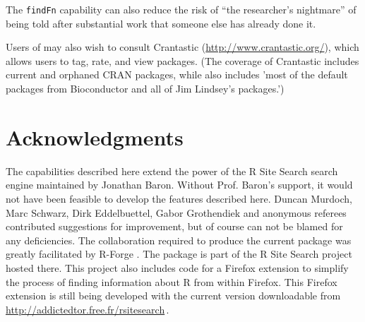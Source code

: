 The {\tt findFn} capability can also reduce the risk
of ``the researcher's nightmare'' of being told after
substantial work that someone else has already done it.

Users of  may also wish to consult Crantastic
(\url{http://www.crantastic.org/}), which allows users to tag, rate,
and view packages.  (The coverage of Crantastic includes current and
orphaned CRAN packages, while \cite{JB09URL}
also includes 'most of the default packages from Bioconductor and all
of Jim Lindsey's packages.')


\section{Acknowledgments}
The capabilities described here extend the power of the
R Site Search search engine maintained by Jonathan Baron.
Without Prof. Baron's support, it would not have been feasible
to develop the features described here. Duncan Murdoch, Marc Schwarz,
Dirk Eddelbuettel, Gabor Grothendiek and anonymous
referees contributed suggestions for improvement, but of course
can not be blamed for any deficiencies.  The collaboration
required to produce the current  package was greatly
facilitated by R-Forge \citep{RFORGE09URL}. The  package
is part of the R Site Search project hosted there.  This project
also includes code for a Firefox extension to simplify the process of
finding information about R from within Firefox.  This Firefox
extension is still being developed with the current version
downloadable from \url{http://addictedtor.free.fr/rsitesearch}\,.

